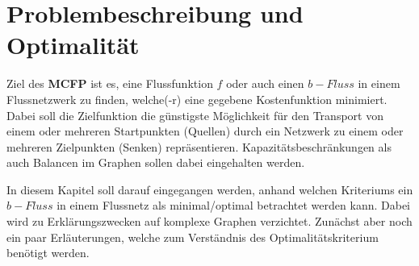 \chapter{Problembeschreibung und Optimalität}

\begin{definition}
Ziel des \textbf{MCFP} ist es, eine Flussfunktion $f$ oder auch einen $b-Fluss$ in einem Flussnetzwerk zu finden, welche(-r) eine gegebene Kostenfunktion minimiert. Dabei soll die Zielfunktion die günstigste Möglichkeit für den Transport von einem oder mehreren Startpunkten (Quellen) durch ein Netzwerk zu einem oder mehreren Zielpunkten (Senken) repräsentieren. Kapazitätsbeschränkungen als auch Balancen im Graphen sollen dabei eingehalten werden.
\end{definition}
In diesem Kapitel soll darauf eingegangen werden, anhand welchen Kriteriums ein $b-Fluss$ in einem Flussnetz als minimal/optimal betrachtet werden kann. Dabei wird zu Erklärungszwecken auf komplexe Graphen verzichtet. Zunächst aber noch ein paar Erläuterungen, welche zum Verständnis des Optimalitätskriterium benötigt werden.

